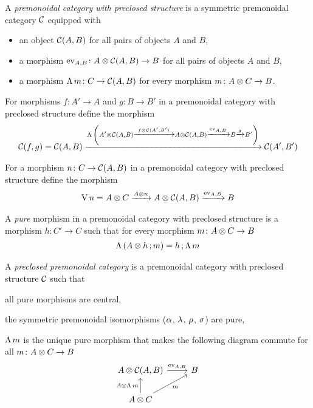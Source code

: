 \documentclass[runningheads,envcountsame]{llncs}
\begin{document}
\begin{definition}
    A \emph{premonoidal category with preclosed structure} is a symmetric premonoidal category $\mathcal{C}$ equipped with
    \begin{itemize}
        \item an object $\mathcal{C}(A, B)$ for all pairs of objects $A$ and $B$,
        \item a morphism $\eval_{A, B}\colon \tensor{A}{\C(A, B)} \to B$ for all pairs of objects $A$ and $B$,
        \item a morphism $\curry\,m\colon C \to \C(A, B)$ for every morphism $m\colon \tensor{A}{C} \to B$.
    \end{itemize}
    
    For morphisms $f\colon A' \to A$ and $g\colon B \to B'$ in a premonoidal category with preclosed structure define the morphism 
    \begin{gather}
        \C(f, g) = \C(A, B) \xrightarrow{\curry\,\left(\tensor{A'}{\C(A, B)} \xrightarrow{\tensor{f}{\C(A', B')}} \tensor{A}{\C(A, B)} \xrightarrow{\eval_{A, B}} B \xrightarrow{g} B'\right)} \C(A',B') \label{def:hom-functor}
    \end{gather}
    
    For a morphism $n\colon C \to \mathcal{C}(A, B)$ in a premonoidal category with preclosed structure define the morphism
    \begin{gather}
        \uncurry\,n = \tensor{A}{C} \xrightarrow{\tensor{A}{n}} \tensor{A}{\C(A, B)} \xrightarrow{\eval_{A, B}} B \label{def:uncurry}
    \end{gather}
    
    A \emph{pure} morphism in a premonoidal category with preclosed structure is a morphism $h\colon C' \to C$ such that for every morphism $m\colon \tensor{A}{C} \to B$
    \begin{align}
        \curry\,(\comp{\tensor{A}{h}}{m}) = \comp{h}{\curry\,m} \label{def:pure}
    \end{align}
    
    A \emph{preclosed premonoidal category} is a premonoidal category with preclosed structure $\mathcal{C}$ such that
    \begin{definitionlist}
        \item \label{def:preclosed-central} all pure morphisms are central,
        \item \label{def:preclosed-premonoidal} the symmetric premonoidal isomorphisms ($\assoc$, $\unitl$, $\unitr$, $\swap$) are pure,
        \item \label{def:preclosed-eval} $\curry\,m$ is the unique pure morphism that makes the following diagram commute for all $m\colon \tensor{A}{C} \to B$
        \begin{equation}
            \begin{tikzcd}
                \tensor{A}{\C(A, B)} \ar[r, "\eval_{A, B}"] & B \\
                \tensor{A}{C} \ar[u, "\tensor{A}{\curry\,m}"] \ar[ur, swap, "m"]
            \end{tikzcd} \label{def:preclosed-eval-diag}
        \end{equation}
    \end{definitionlist}
\end{definition}
\end{document}
